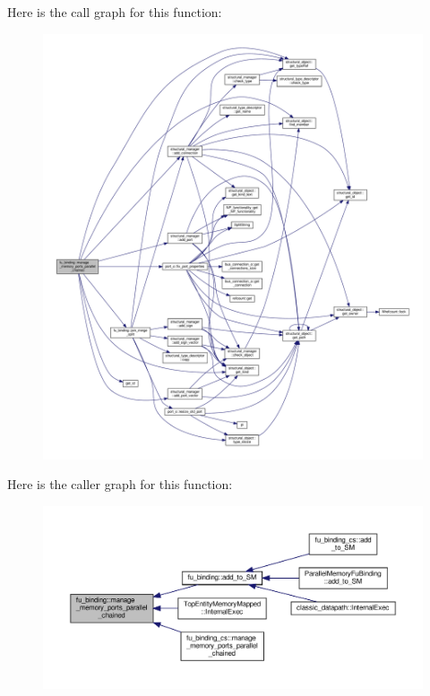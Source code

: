 Here is the call graph for this function\+:
\nopagebreak
\begin{figure}[H]
\begin{center}
\leavevmode
\includegraphics[width=350pt]{d8/d04/classfu__binding_a18f39279fa00ac40a2990cdbff230485_cgraph}
\end{center}
\end{figure}
Here is the caller graph for this function\+:
\nopagebreak
\begin{figure}[H]
\begin{center}
\leavevmode
\includegraphics[width=350pt]{d8/d04/classfu__binding_a18f39279fa00ac40a2990cdbff230485_icgraph}
\end{center}
\end{figure}
\mbox{\label{classfu__binding_a22ec0ba3bb337532e0fca26e2625085e}} 
